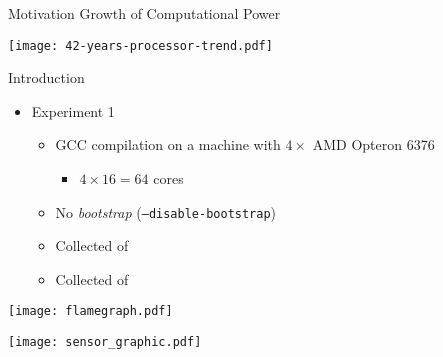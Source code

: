 \begin{frame}{Motivation}
    Growth of Computational Power \citep{42years}

    \centering
    \texttt{[image: 42-years-processor-trend.pdf]}
    \label{fig:42years}
\end{frame}


\begin{frame}{Introduction}
    \begin{itemize}
        \item Experiment 1
        \begin{itemize}
            \item GCC compilation on a machine with $4\times$ AMD Opteron 6376
                \begin{itemize}
                    \item $4 \times 16 = 64$ cores
                \end{itemize}
            \item No \textit{bootstrap} (\texttt{--disable-bootstrap})
            \item Collected {\color{blue}{Compilation Time}} of {\color{red}{each file}}
            \item Collected {\color{blue}{Consumed Energy}} of {\color{red}{all CPUs}}
        \end{itemize}
    \end{itemize}
\end{frame}

\begin{frame}
    \texttt{[image: flamegraph.pdf]}
    \label{fig:analysis_classical}
\end{frame}

\begin{frame}
    \centering
    \texttt{[image: sensor\_graphic.pdf]}
    \label{fig:sensor_graphic}
\end{frame}


